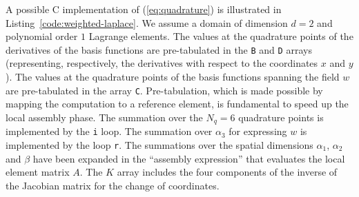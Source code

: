 A possible C implementation of (\ref{eq:quadrature}) is illustrated in Listing~\ref{code:weighted-laplace}. We assume a domain of dimension $d=2$ and polynomial order $1$ Lagrange elements. The values at the quadrature points of the derivatives of the basis functions are pre-tabulated in the \texttt{B} and \texttt{D} arrays (representing, respectively, the derivatives with respect to the coordinates $x$ and $y$). The values at the quadrature points of the basis functions spanning the field $w$ are pre-tabulated in the array \texttt{C}. Pre-tabulation, which is made possible by mapping the computation to a reference element, is fundamental to speed up the local assembly phase. The summation over the $N_q = 6$ quadrature points is implemented by the \texttt{i} loop. The summation over $\alpha_3$ for expressing $w$ is implemented by the loop \texttt{r}. The summations over the spatial dimensions $\alpha_1$, $\alpha_2$ and $\beta$ have been expanded in the ``assembly expression'' that evaluates the local element matrix $A$. The $K$ array includes the four components of the inverse of the Jacobian matrix for the change of coordinates. 

